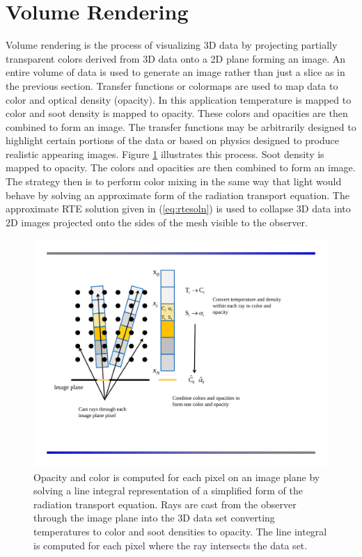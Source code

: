 {\section{Volume Rendering}
Volume rendering is the process of visualizing 3D data by
projecting partially transparent colors derived from 3D data onto
a 2D plane forming an image.  An entire volume of data is used to
generate an image rather than just a slice as in the previous
section.  Transfer functions or colormaps are used to map data to
color and optical density (opacity).  In this application
temperature is mapped to color and soot density is mapped to
opacity.  These colors and opacities are then combined to form an
image.  The transfer functions may be arbitrarily designed to
highlight certain portions of the data or based on physics
designed to produce realistic appearing images.  Figure
\ref{figsmokesetup2} illustrates this process. Soot density is
mapped to opacity.  The colors and opacities are then combined to
form an image.  The strategy then is to perform color mixing in
the same way that light would behave by solving an approximate
form of the radiation transport equation.  The approximate RTE
solution given in (\ref{eq:rtesoln})  is used to collapse 3D data
into 2D images projected onto the sides of the mesh visible to the
observer.

\begin{figure}[\figoptions]
\begin{center}
\includegraphics[width=6.5in]{FIGURES/smoke_setup2}
\end{center}
\caption[Opacity and color is computed for each pixel on an image
plane by solving a line integral representation of a simplified
form of the radiation transport equation.]{Opacity and color is
computed for each pixel on an image plane by solving a line
integral representation of a simplified form of the radiation
transport equation.  Rays are cast from the observer through the
image plane into the 3D data set converting temperatures to color
and soot densities to opacity.  The line integral is computed for
each pixel where the ray intersects the data set. }
\label{figsmokesetup2}
\end{figure}

}

